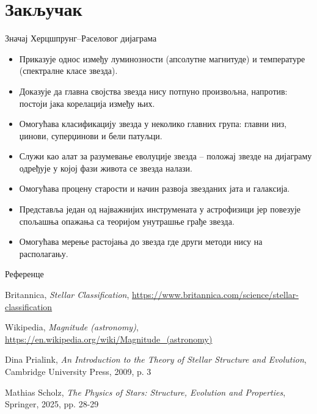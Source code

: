 \documentclass[aspectratio=169, xcolor=table, 10pt]{beamer}
\theoremstyle{definition}
\begin{document}
\section{Закључак}

\begin{frame}{Значај Херцшпрунг–Раселовог дијаграма}
  \begin{itemize}
    \item Приказује однос између луминозности (апсолутне магнитуде) и температуре (спектралне класе звезда).
    \item Доказује да главна својства звезда нису потпуно произвољна, напротив: постоји јака корелација између њих.
    \item Омогућава класификацију звезда у неколико главних група: главни низ, џинови, суперџинови и бели патуљци.
    \item Служи као алат за разумевање еволуције звезда – положај звезде на дијаграму одређује у којој фази живота се звезда налази.
    \item Омогућава процену старости и начин развоја звезданих јата и галаксија.
    \item Представља један од најважнијих инструмената у астрофизици јер повезује спољашња опажања са теоријом унутрашње грађе звезда.
    \item Омогућава мерење растојања до звезда где други методи нису на располагању.
  \end{itemize}
\end{frame}

\begin{frame}{Референце}
    \begin{thebibliography}{9}

      Britannica,
      \textit{Stellar Classification},
      \url{https://www.britannica.com/science/stellar-classification}

      Wikipedia,
      \textit{Magnitude (astronomy)},
      \url{https://en.wikipedia.org/wiki/Magnitude_(astronomy)}

      Dina Prialink,
      \textit{An Introduction to the Theory of Stellar Structure and Evolution},
      Cambridge University Press, 2009, p. 3

      Mathias Scholz,
      \textit{The Physics of Stars: Structure, Evolution and Properties},
      Springer, 2025, pp. 28-29

    \end{thebibliography}
\end{frame}
\end{document}
